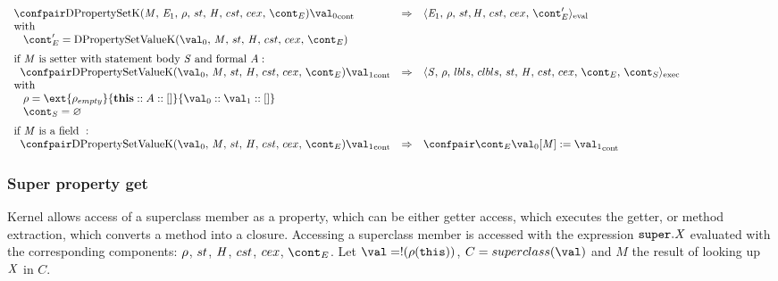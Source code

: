 \documentclass{article}
\renewcommand{\emptyset}{\varnothing}
\begin{document}
\[
  \begin{array}{lcl@{\hspace{30mm}}}
	\cesktrans{
		\contconf{\DirectPropertySetK}{\val_0}}{
		\evalconf{\expressionmeta_1}{\env}{\strace}{\cstrace}{\cex}{\econt'}}\\
	\textrm{with}\\
	\hspace{3mm}
	\econt' = \DPropertySetVK\\[2mm]

	\textrm{if }\membermeta \textrm{ is setter with statement body }\stmt \textrm{ and formal }\formal :\\
	\hspace{2mm}
	\cesktrans{
		\contconf{\DPropertySetVK}{\val_1}}{
		\execconf{\stmt}{\env}{\lbls}{\clbls}{\handler}{\cstrace}{\cex}{\econt}{\scont}}\\
	\textrm{with}\\
	\hspace{3mm}
	\env = \ext{\env_{empty}}{\mathbf{this} :: \formal :: []}{\val_0 :: \val_1 :: []}\\
	\hspace{3mm}
	\scont = \emptyset\\[2mm]

	\textrm{if }\membermeta \textrm{ is a field } :\\
	\hspace{2mm}
	\cesktrans{
		\contconf{\DPropertySetVK}{\val_1}}{
		\contconf{\econt}{\update{\val_0[\membermeta]}{\val_1}}}
  \end{array}
\]

\subsubsection{Super property get}
\label{subsubsec:super-property-get}
Kernel allows access of a superclass member as a property, which can be either getter access, which executes the getter, or method extraction, which converts a method into a closure.
\noindent
Accessing a superclass member is accessed with the expression $\tt{super}.\mathit{X}$ evaluated with the corresponding components: $\rho$, $st$, $\mathit{H}$, $cst$, $cex$, $\econt$.
Let $\val = \deref{(\env(\this))}$, $C = \superclass{\val}$ and $M$ the result of looking up $\mathit{X}$ in $C$.\\
\end{document}
